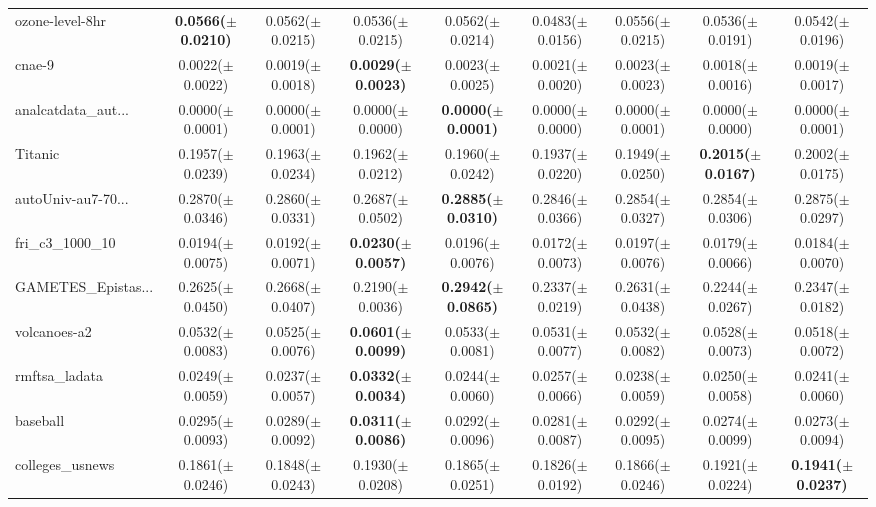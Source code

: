 \begin{longtable}{lcccccccc}
ozone-level-8hr & \textbf{0.0566($\pm$0.0210)} & 0.0562($\pm$0.0215) & 0.0536($\pm$0.0215) & 0.0562($\pm$0.0214) & 0.0483($\pm$0.0156) & 0.0556($\pm$0.0215) & 0.0536($\pm$0.0191) & 0.0542($\pm$0.0196) \\
cnae-9 & 0.0022($\pm$0.0022) & 0.0019($\pm$0.0018) & \textbf{0.0029($\pm$0.0023)} & 0.0023($\pm$0.0025) & 0.0021($\pm$0.0020) & 0.0023($\pm$0.0023) & 0.0018($\pm$0.0016) & 0.0019($\pm$0.0017) \\
analcatdata\_aut... & 0.0000($\pm$0.0001) & 0.0000($\pm$0.0001) & 0.0000($\pm$0.0000) & \textbf{0.0000($\pm$0.0001)} & 0.0000($\pm$0.0000) & 0.0000($\pm$0.0001) & 0.0000($\pm$0.0000) & 0.0000($\pm$0.0001) \\
Titanic & 0.1957($\pm$0.0239) & 0.1963($\pm$0.0234) & 0.1962($\pm$0.0212) & 0.1960($\pm$0.0242) & 0.1937($\pm$0.0220) & 0.1949($\pm$0.0250) & \textbf{0.2015($\pm$0.0167)} & 0.2002($\pm$0.0175) \\
autoUniv-au7-70... & 0.2870($\pm$0.0346) & 0.2860($\pm$0.0331) & 0.2687($\pm$0.0502) & \textbf{0.2885($\pm$0.0310)} & 0.2846($\pm$0.0366) & 0.2854($\pm$0.0327) & 0.2854($\pm$0.0306) & 0.2875($\pm$0.0297) \\
fri\_c3\_1000\_10 & 0.0194($\pm$0.0075) & 0.0192($\pm$0.0071) & \textbf{0.0230($\pm$0.0057)} & 0.0196($\pm$0.0076) & 0.0172($\pm$0.0073) & 0.0197($\pm$0.0076) & 0.0179($\pm$0.0066) & 0.0184($\pm$0.0070) \\
GAMETES\_Epistas... & 0.2625($\pm$0.0450) & 0.2668($\pm$0.0407) & 0.2190($\pm$0.0036) & \textbf{0.2942($\pm$0.0865)} & 0.2337($\pm$0.0219) & 0.2631($\pm$0.0438) & 0.2244($\pm$0.0267) & 0.2347($\pm$0.0182) \\
volcanoes-a2 & 0.0532($\pm$0.0083) & 0.0525($\pm$0.0076) & \textbf{0.0601($\pm$0.0099)} & 0.0533($\pm$0.0081) & 0.0531($\pm$0.0077) & 0.0532($\pm$0.0082) & 0.0528($\pm$0.0073) & 0.0518($\pm$0.0072) \\
rmftsa\_ladata & 0.0249($\pm$0.0059) & 0.0237($\pm$0.0057) & \textbf{0.0332($\pm$0.0034)} & 0.0244($\pm$0.0060) & 0.0257($\pm$0.0066) & 0.0238($\pm$0.0059) & 0.0250($\pm$0.0058) & 0.0241($\pm$0.0060) \\
baseball & 0.0295($\pm$0.0093) & 0.0289($\pm$0.0092) & \textbf{0.0311($\pm$0.0086)} & 0.0292($\pm$0.0096) & 0.0281($\pm$0.0087) & 0.0292($\pm$0.0095) & 0.0274($\pm$0.0099) & 0.0273($\pm$0.0094) \\
colleges\_usnews & 0.1861($\pm$0.0246) & 0.1848($\pm$0.0243) & 0.1930($\pm$0.0208) & 0.1865($\pm$0.0251) & 0.1826($\pm$0.0192) & 0.1866($\pm$0.0246) & 0.1921($\pm$0.0224) & \textbf{0.1941($\pm$0.0237)} \\

\end{longtable}
